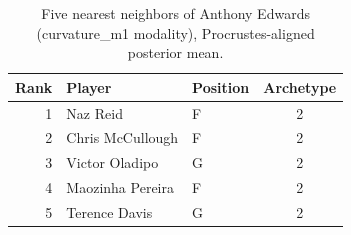 \begin{table}[htbp]
  \centering\small
  \begin{tabular}{rllc}
    \toprule
    Rank & Player & Position & Archetype \\
    \midrule
    1 & Naz Reid & F & 2 \\
    2 & Chris McCullough & F & 2 \\
    3 & Victor Oladipo & G & 2 \\
    4 & Maozinha Pereira & F & 2 \\
    5 & Terence Davis & G & 2 \\
    \bottomrule
  \end{tabular}
  \caption{Five nearest neighbors of Anthony Edwards (curvature_m1 modality), Procrustes-aligned posterior mean.}
  \label{tab:Anthony_Edwards_neighbors_curvature_m1}
\end{table}

